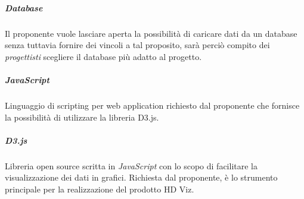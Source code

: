 \subparagraph{Database}

Il proponente vuole lasciare aperta la possibilità di caricare dati da un database senza tuttavia fornire dei vincoli
a tal proposito, sarà perciò compito dei \emph{progettisti} scegliere il database più adatto al progetto.

\subparagraph{JavaScript}

Linguaggio di scripting per web application richiesto dal proponente che fornisce la possibilità di utilizzare la
libreria D3.js.

\subparagraph{D3.js}

Libreria open source scritta in \emph{JavaScript} con lo scopo di facilitare la visualizzazione dei dati in grafici.
Richiesta dal proponente, è lo strumento principale per la realizzazione del prodotto HD Viz.
